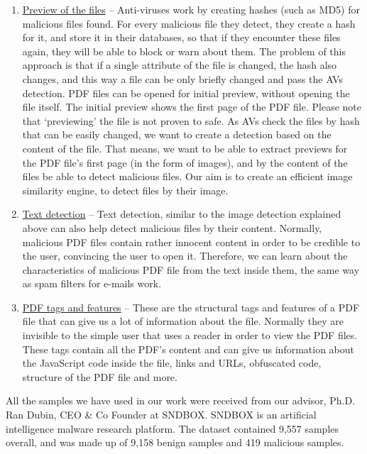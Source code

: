 \documentclass{article}
\begin{document}
\begin{enumerate}
	\item \underline{Preview of the files} – Anti-viruses work by creating hashes (such as MD5) for malicious files found. For every malicious file they detect, they create a hash for it, and store it in their databases, so that if they encounter these files again, they will be able to block or warn about them. The problem of this approach is that if a single attribute of the file is changed, the hash also changes, and this way a file can be only briefly changed and pass the AVs detection. PDF files can be opened for initial preview, without opening the file itself. The initial preview shows the first page of the PDF file. Please note that ‘previewing’ the file is not proven to safe.\newline
	As AVs check the files by hash that can be easily changed, we want to create a detection based on the content of the file. That means, we want to be able to extract previews for the PDF file’s first page (in the form of images), and by the content of the files be able to detect malicious files. Our aim is to create an efficient image similarity engine, to detect files by their image.
	\item \underline{Text detection} – Text detection, similar to the image detection explained above can also help detect malicious files by their content. Normally, malicious PDF files contain rather innocent content in order to be credible to the user, convincing the user to open it. Therefore, we can learn about the characteristics of malicious PDF file from the text inside them, the same way as spam filters for e-mails work.
	\item \underline{PDF tags and features} – These are the structural tags and features of a PDF file that can give us a lot of information about the file. Normally they are invisible to the simple user that uses a reader in order to view the PDF files. These tags contain all the PDF's content and can give us information about the JavaScript code inside the file, links and URLs, obfuscated code, structure of the PDF file and more.
\end{enumerate}

\indent All the samples we have used in our work were received from our advisor, Ph.D. Ran Dubin, CEO \& Co Founder at SNDBOX. SNDBOX is an artificial intelligence malware research platform. The dataset contained 9,557 samples overall, and was made up of 9,158 benign samples and 419 malicious samples.
\end{document}
